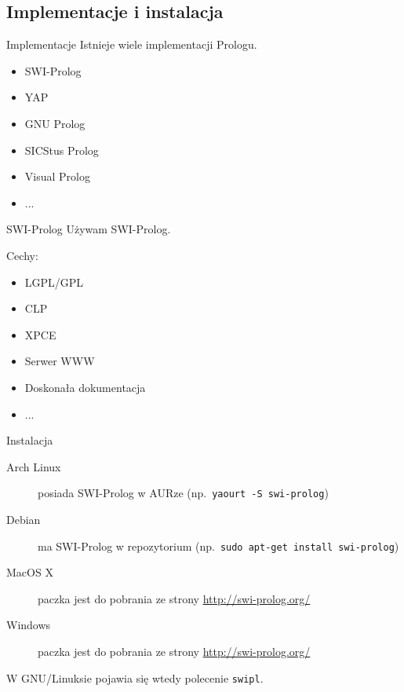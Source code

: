\documentclass[blue]{beamer}
\begin{document}
\subsection{Implementacje i instalacja}
\begin{frame}{Implementacje}
Istnieje wiele implementacji Prologu.
\begin{itemize}
\item SWI-Prolog
\item YAP
\item GNU Prolog
\item SICStus Prolog
\item Visual Prolog
\item ...
\end{itemize}
\end{frame}
\begin{frame}{SWI-Prolog}
Używam SWI-Prolog.

Cechy:
\begin{itemize}
\item LGPL/GPL
\item CLP
\item XPCE
\item Serwer WWW
\item Doskonała dokumentacja
\item ...
\end{itemize}
\end{frame}
\begin{frame}[fragile]{Instalacja}
\begin{description}
\item[Arch Linux] posiada SWI-Prolog w AURze (np.~\verb+yaourt -S swi-prolog+)
\item[Debian] ma SWI-Prolog w repozytorium (np.~\verb+sudo apt-get install swi-prolog+)
\item[MacOS X] paczka jest do pobrania ze strony \url{http://swi-prolog.org/}
\item[Windows] paczka jest do pobrania ze strony \url{http://swi-prolog.org/}
\end{description}

W GNU/Linuksie pojawia się wtedy polecenie \verb+swipl+.
\end{frame}
\end{document}
